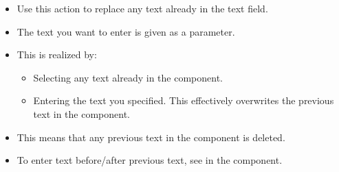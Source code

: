 \begin{itemize}
\item Use this action to replace any text already in the text field.
\item The text you want to enter is given as a parameter.
\item This is realized by:
\begin{itemize}
\item Selecting any text already in the component. 
\item Entering the text you specified. This effectively overwrites the previous text in the component. 
\end{itemize}
\item This means that any previous text in the component is deleted. 
\item To enter text before/after previous text, see  in the  component.
\end{itemize}
 


